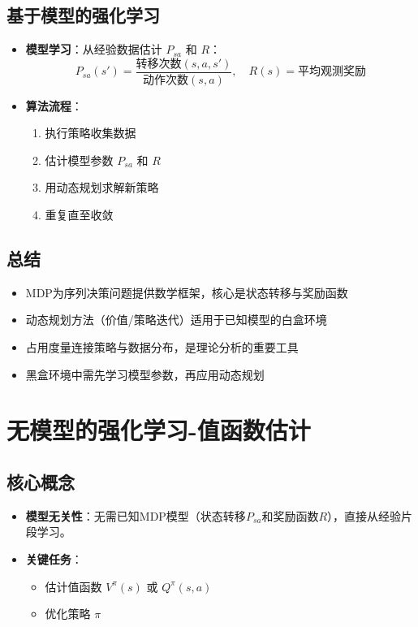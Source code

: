 \subsection{基于模型的强化学习}
\begin{itemize}
    \item \textbf{模型学习}：从经验数据估计 \(P_{sa}\) 和 \(R\)：
        \[
        P_{sa}(s') = \frac{\text{转移次数}(s,a,s')}{\text{动作次数}(s,a)}, \quad R(s) = \text{平均观测奖励}
        \]
    \item \textbf{算法流程}：
        \begin{enumerate}
            \item 执行策略收集数据
            \item 估计模型参数 \(P_{sa}\) 和 \(R\)
            \item 用动态规划求解新策略
            \item 重复直至收敛
        \end{enumerate}
\end{itemize}

\subsection{总结}
\begin{itemize}
    \item MDP为序列决策问题提供数学框架，核心是状态转移与奖励函数
    \item 动态规划方法（价值/策略迭代）适用于已知模型的白盒环境
    \item 占用度量连接策略与数据分布，是理论分析的重要工具
    \item 黑盒环境中需先学习模型参数，再应用动态规划
\end{itemize}

\section{无模型的强化学习-值函数估计}
\subsection{核心概念}
\begin{itemize}
    \item \textbf{模型无关性}：无需已知MDP模型（状态转移$P_{sa}$和奖励函数$R$），直接从经验片段学习。
    \item \textbf{关键任务}：
        \begin{itemize}
            \item 估计值函数 $V^\pi(s)$ 或 $Q^\pi(s,a)$
            \item 优化策略 $\pi$
        \end{itemize}
\end{itemize}

